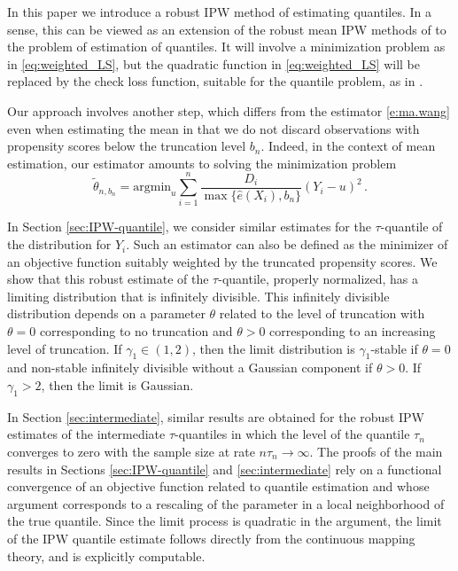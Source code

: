 \documentclass[12pt]{amsart}
\newcommand{\1}{\mathbbm{1}}
\newcommand{\0}{\mathbf{0}}
\theoremstyle{plain}
\theoremstyle{definition}
\begin{document}
In this paper we introduce a robust IPW method of estimating quantiles. In a sense, this  can be viewed as an extension of the robust mean  IPW methods of \cite{ma:wang2020, heiler:kazak2021} to the problem of estimation of quantiles. It will 
involve a minimization problem as in \eqref{eq:weighted_LS}, but the quadratic function in \eqref{eq:weighted_LS} will be replaced by the check loss function, suitable for the quantile problem, as in  \cite{firpo2007,zhang2018}.  

Our approach involves another step, which differs from the estimator \eqref{e:ma.wang} even when estimating the mean in that we do not discard observations with propensity scores below the truncation level $b_n$. Indeed, in the context of mean estimation, our estimator amounts to solving the minimization problem 
%
\begin{equation*}
    \label{eq:trunc_SIPW}
    \tilde \theta_{n,b_n}= \mbox{argmin}_u \sum_{i=1}^n \frac{D_i}{\max\{\hat e(X_i),b_n\}}(Y_i-u)^2\,.
\end{equation*}
%

In Section \ref{sec:IPW-quantile}, we consider similar estimates for the $\tau$-quantile of the distribution for $Y_i$. Such an estimator can also be defined as the minimizer of an objective function suitably weighted by the truncated propensity scores.  We show that this robust estimate of the $\tau$-quantile, properly normalized, has a limiting distribution that is infinitely divisible.  This infinitely divisible distribution  depends on a parameter $\theta$  related to the level of truncation with $\theta=0$ corresponding to no truncation and $\theta>0$ corresponding to an increasing level of truncation.  If  $\gamma_1\in(1,2)$, then the limit distribution is $\gamma_1$-stable if $\theta=0$ and non-stable infinitely divisible without a Gaussian component if $\theta>0$.  If $\gamma_1>2$, then the limit is Gaussian.

In Section \ref{sec:intermediate}, similar results are obtained for the robust IPW estimates of the intermediate $\tau$-quantiles in which the level of the quantile $\tau_n$ converges to zero with the sample size at rate $n\tau_n\to \infty$.  The proofs of the main results in Sections \ref{sec:IPW-quantile} and \ref{sec:intermediate} rely on a functional convergence of an objective function related to quantile estimation and whose argument corresponds to a rescaling of the parameter in a local neighborhood of the true quantile.  Since the limit process is quadratic in the argument,  the limit of the IPW quantile estimate follows directly from the continuous mapping theory, and is explicitly computable.    
\end{document}
